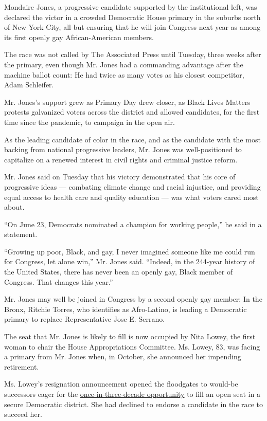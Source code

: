 Mondaire Jones, a progressive candidate supported by the institutional
left, was declared the victor in a crowded Democratic House primary in
the suburbs north of New York City, all but ensuring that he will join
Congress next year as among its first openly gay African-American
members.

The race was not called by The Associated Press until Tuesday, three
weeks after the primary, even though Mr. Jones had a commanding
advantage after the machine ballot count: He had twice as many votes as
his closest competitor, Adam Schleifer.

Mr. Jones's support grew as Primary Day drew closer, as Black Lives
Matters protests galvanized voters across the district and allowed
candidates, for the first time since the pandemic, to campaign in the
open air.

As the leading candidate of color in the race, and as the candidate with
the most backing from national progressive leaders, Mr. Jones was
well-positioned to capitalize on a renewed interest in civil rights and
criminal justice reform.

Mr. Jones said on Tuesday that his victory demonstrated that his core of
progressive ideas --- combating climate change and racial injustice, and
providing equal access to health care and quality education --- was what
voters cared most about.

``On June 23, Democrats nominated a champion for working people,'' he
said in a statement.

``Growing up poor, Black, and gay, I never imagined someone like me
could run for Congress, let alone win,'' Mr. Jones said. ``Indeed, in
the 244-year history of the United States, there has never been an
openly gay, Black member of Congress. That changes this year.''

Mr. Jones may well be joined in Congress by a second openly gay member:
In the Bronx, Ritchie Torres, who identifies as Afro-Latino, is leading
a Democratic primary to replace Representative Jose E. Serrano.

The seat that Mr. Jones is likely to fill is now occupied by Nita Lowey,
the first woman to chair the House Appropriations Committee. Ms. Lowey,
83, was facing a primary from Mr. Jones when, in October, she announced
her impending retirement.

Ms. Lowey's resignation announcement opened the floodgates to would-be
successors eager for the
\href{https://www.nytimes3xbfgragh.onion/2020/06/19/nyregion/democratic-primary-house-ny.html}{once-in-three-decade
opportunity} to fill an open seat in a secure Democratic district. She
had declined to endorse a candidate in the race to succeed her.

